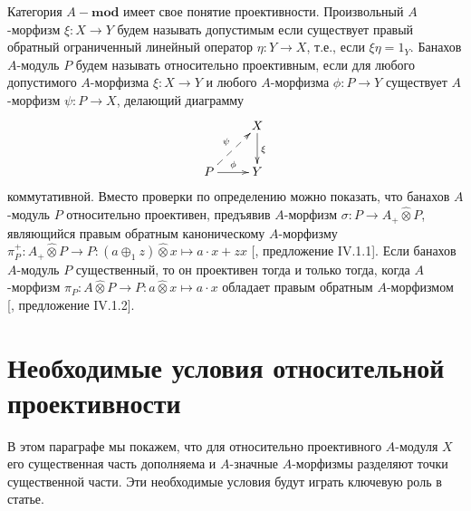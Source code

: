 \documentclass[12pt]{article}
\newcommand{\projtens}{\mathbin{\widehat{\otimes}}}
\begin{document}
Категория $A-\mathbf{mod}$ имеет свое понятие проективности. Произвольный $A$-морфизм $\xi:X\to Y$ будем называть допустимым если существует правый обратный ограниченный линейный оператор $\eta:Y\to X$, т.е., если $\xi\eta=1_Y$. Банахов $A$-модуль $P$ будем называть относительно проективным, если для любого допустимого $A$-морфизма $\xi:X\to Y$ и любого $A$-морфизма $\phi:P\to Y$ существует $A$-морфизм $\psi:P\to X$, делающий диаграмму
$$
    \xymatrix{
    & {X} \ar[d]^{\xi}\\
    {P} \ar@{-->}[ur]^{\psi} \ar[r]^{\phi} &{Y}}
$$
коммутативной. Вместо проверки по определению можно показать, что банахов $A$-модуль $P$ относительно проективен, предъявив $A$-морфизм $\sigma:P\to A_+\projtens P$, являющийся правым обратным каноническому $A$-морфизму $\pi_P^+:A_+\projtens P\to P:(a\oplus_1 z)\projtens x\mapsto a\cdot x+z x$ [\cite{HelHomolBanTopAlg}, предложение IV.1.1]. Если банахов $A$-модуль $P$ существенный, то он проективен тогда и только тогда, когда $A$-морфизм $\pi_P:A\projtens P\to P: a\projtens x\mapsto a\cdot x$ обладает правым обратным $A$-морфизмом [\cite{HelHomolBanTopAlg}, предложение IV.1.2].


\section{Необходимые условия относительной проективности}
\label{NecessaryConditions}

В этом параграфе мы покажем, что для относительно проективного $A$-модуля $X$ его существенная часть дополняема и $A$-значные $A$-морфизмы разделяют точки существенной части. Эти необходимые условия будут играть ключевую роль в статье.
\end{document}
